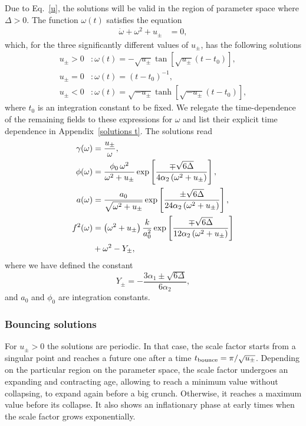\documentclass[aps,prd,12pt,superscriptaddress,showpacs,showkeys,longbibliography,reprint,nofootinbib]{revtex4-1}
\begin{document}
Due to Eq.~\eqref{u}, the solutions will be valid in the region of parameter space where $\Delta>0$. The function $\omega(t)$ satisfies the equation
\begin{align}
  \dot{\omega}+\omega^2+u_{\pm} &= 0,
\end{align}
which, for the three significantly different values of $u_\pm$, has the following solutions
\begin{align}
  u_\pm>0&:\omega(t)=-\sqrt{u_\pm}\tan\left[\sqrt{u_\pm}\left(t-t_0\right)\right],\\
  u_\pm=0&:\omega(t)=\left(t-t_0\right)^{-1},\\
  u_\pm<0&:\omega(t)=\sqrt{-u_\pm}\tanh\left[\sqrt{-u_\pm}\left(t-t_0\right)\right],
\end{align}
where $t_0$ is an integration constant to be fixed. We relegate the time-dependence of the remaining fields to these expressions for $\omega$ and list their explicit time dependence in Appendix~\ref{solutions t}. The solutions read
\begin{align}
  \gamma(\omega)&=\frac{u_\pm}{\omega},\\
  \phi(\omega)&=\frac{\phi_0\,\omega^2}{\omega^2+u_\pm}\exp\left[\frac{\mp\sqrt{6\Delta}}{4\alpha_2\left(\omega^2+u_\pm\right)}\right],\\
  a(\omega)&=\frac{a_0}{\sqrt{\omega^2+u_\pm}}\exp\left[\frac{\pm\sqrt{6\Delta}} {24\alpha_2\left(\omega^2+u_\pm\right)}\right],\\
  f^2(\omega)&=\left(\omega^2+u_\pm\right)\frac{k}{a_0^2}\exp\left[\frac{\mp\sqrt{6\Delta}}{12\alpha_2\left(\omega^2+u_\pm\right)}\right]\notag\\
  &+\omega^2-Y_\pm,
\end{align}
where we have defined the constant
\begin{equation*}
  Y_{\pm} = -\frac{3\alpha_1\pm\sqrt{6\Delta}}{6\alpha_2},
\end{equation*}
and $a_0$ and $\phi_0$ are integration constants.

\subsubsection{Bouncing solutions}

For $u_\pm>0$ the solutions are periodic. In that case, the scale factor starts from a singular point and reaches a future one after a time $t_{\rm bounce}=\pi/\sqrt{u_\pm}$. Depending on the particular region on the parameter space, the scale factor undergoes an expanding and contracting age, allowing to reach a minimum value without collapsing, to expand again before a big crunch. Otherwise, it reaches a maximum value before its collapse. It also shows an inflationary phase at early times when the scale factor grows exponentially.
\end{document}
